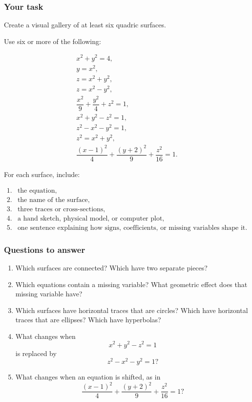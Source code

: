 \subsubsection*{Your task}

Create a visual gallery of at least six quadric surfaces.

Use six or more of the following:

\[
\begin{array}{c}
x^2+y^2=4,\\[1mm]
y=x^2,\\[1mm]
z=x^2+y^2,\\[1mm]
z=x^2-y^2,\\[1mm]
\dfrac{x^2}{9}+\dfrac{y^2}{4}+z^2=1,\\[4mm]
x^2+y^2-z^2=1,\\[1mm]
z^2-x^2-y^2=1,\\[1mm]
z^2=x^2+y^2,\\[1mm]
\dfrac{(x-1)^2}{4}+\dfrac{(y+2)^2}{9}+\dfrac{z^2}{16}=1.
\end{array}
\]

For each surface, include:

\[
\begin{array}{ll}
1. & \text{the equation,}\\
2. & \text{the name of the surface,}\\
3. & \text{three traces or cross-sections,}\\
4. & \text{a hand sketch, physical model, or computer plot,}\\
5. & \text{one sentence explaining how signs, coefficients, or missing variables shape it.}
\end{array}
\]

\subsubsection*{Questions to answer}

\begin{enumerate}
\item Which surfaces are connected?  Which have two separate pieces?

\item Which equations contain a missing variable?  What geometric effect does that
missing variable have?

\item Which surfaces have horizontal traces that are circles?  Which have horizontal
traces that are ellipses?  Which have hyperbolas?

\item What changes when
\[
    x^2+y^2-z^2=1
\]
is replaced by
\[
    z^2-x^2-y^2=1?
\]

\item What changes when an equation is shifted, as in
\[
    \frac{(x-1)^2}{4}+\frac{(y+2)^2}{9}+\frac{z^2}{16}=1?
\]
\end{enumerate}

